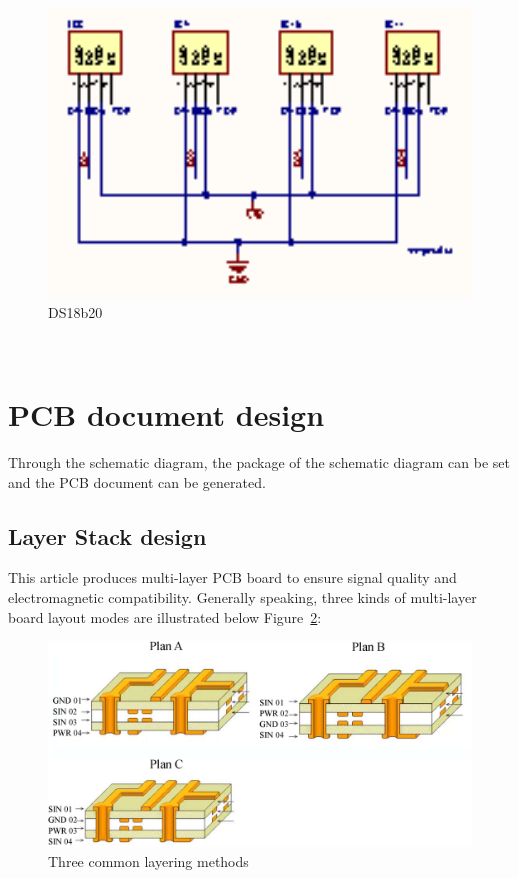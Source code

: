 \begin{figure}[!ht]
	\centering
	\includegraphics[width=16cm]{grafiken/ds18b20.eps}
	\caption{DS18b20} 
	\label{fig:6.9}
\end{figure}
\FloatBarrier
\\



\section{PCB document design}
\label{sec:PCB document design}
Through the schematic diagram, the package of the schematic diagram can be set and the PCB document can be generated.


\subsection{Layer Stack design}
\label{sec:Layer Stack design}

This article produces multi-layer PCB board to ensure signal quality and electromagnetic compatibility. Generally speaking, three kinds of multi-layer board layout modes are illustrated below Figure~\ref{fig:6.10}:
\begin{figure}[!ht]
	\centering
	\includegraphics[width=16cm]{grafiken/6.10.eps}
	\caption{Three common layering methods} 
	\label{fig:6.10}
\end{figure}
\FloatBarrier
\\


